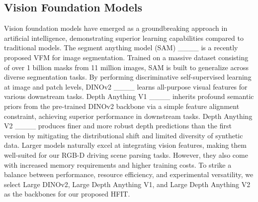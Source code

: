 \subsection{Vision Foundation Models}
\label{sec:DINOV2}
Vision foundation models have emerged as a groundbreaking approach in artificial intelligence, demonstrating superior learning capabilities compared to traditional models. The segment anything model (SAM) ____ is a recently proposed VFM for image segmentation. Trained on a massive dataset consisting of over 1 billion masks from 11 million images, SAM is built to generalize across diverse segmentation tasks. By performing discriminative self-supervised learning at image and patch levels, DINOv2 ____ learns all-purpose visual features for various downstream tasks. Depth Anything V1 ____ inherits profound semantic priors from the pre-trained DINOv2 backbone via a simple feature alignment constraint, achieving superior performance in downstream tasks. Depth Anything V2 ____ produces finer and more robust depth predictions than the first version by mitigating the distributional shift and limited diversity of synthetic data. Larger models naturally excel at integrating vision features, making them well-suited for our RGB-D driving scene parsing tasks. However, they also come with increased memory requirements and higher training costs. To strike a balance between performance, resource efficiency, and experimental versatility, we select Large DINOv2, Large Depth Anything V1, and Large Depth Anything V2 as the backbones for our proposed HFIT.